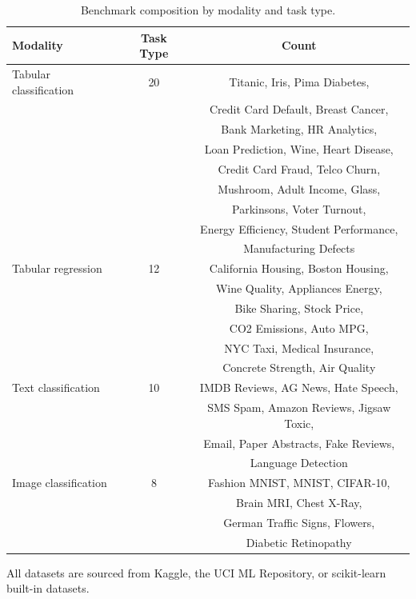 \documentclass[conference]{IEEEtran}
\begin{document}
\begin{table}[ht]
  \centering
  \small
  \caption{Benchmark composition by modality and task type.}
  \label{tab:benchmark}
  \begin{tabular}{lcc}
  \toprule
  \textbf{Modality} & \textbf{Task Type} & \textbf{Count} \\
  \midrule
  Tabular classification & 20 & Titanic, Iris, Pima Diabetes, \\
  & & Credit Card Default, Breast Cancer, \\
  & & Bank Marketing, HR Analytics, \\
  & & Loan Prediction, Wine, Heart Disease, \\
  & & Credit Card Fraud, Telco Churn, \\
  & & Mushroom, Adult Income, Glass, \\
  & & Parkinsons, Voter Turnout, \\
  & & Energy Efficiency, Student Performance, \\
  & & Manufacturing Defects \\
  \midrule
  Tabular regression & 12 & California Housing, Boston Housing, \\
  & & Wine Quality, Appliances Energy, \\
  & & Bike Sharing, Stock Price, \\
  & & CO2 Emissions, Auto MPG, \\
  & & NYC Taxi, Medical Insurance, \\
  & & Concrete Strength, Air Quality \\
  \midrule
  Text classification & 10 & IMDB Reviews, AG News, Hate Speech, \\
  & & SMS Spam, Amazon Reviews, Jigsaw Toxic, \\
  & & Email, Paper Abstracts, Fake Reviews, \\
  & & Language Detection \\
  \midrule
  Image classification & 8 & Fashion MNIST, MNIST, CIFAR-10, \\
  & & Brain MRI, Chest X-Ray, \\
  & & German Traffic Signs, Flowers, \\
  & & Diabetic Retinopathy \\
  \bottomrule
  \end{tabular}
\end{table}

All datasets are sourced from Kaggle, the UCI ML Repository, or scikit-learn built-in
datasets.
\end{document}
